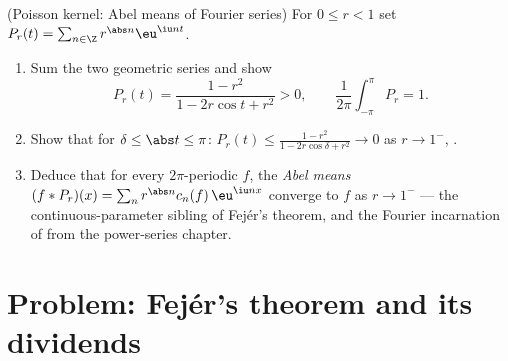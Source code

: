 \begin{exercise}[$\star\star\star$]\label{exo:b2:fourier:12}
(Poisson kernel: Abel means of Fourier series) For $0 \leq r <
1$ set $P_r(t) = \sum_{n\in\Z} r^{\abs n}\eu^{\iu nt}$.
\begin{enumerate}
  \item Sum the two geometric series and show
        \[
        P_r(t) = \frac{1 - r^2}{1 - 2r\cos t + r^2} > 0,
        \qquad
        \frac{1}{2\pi}\int_{-\pi}^{\pi}P_r = 1 .
        \]
  \item Show that for $\delta \leq \abs t \leq \pi$: $P_r(t)
        \leq \frac{1 - r^2}{1 - 2r\cos\delta + r^2} \to 0$ as
        $r \to 1^-$, .
  \item Deduce that for every  $2\pi$-periodic $f$,
        the \emph{Abel means} $(f * P_r)(x) = \sum_n
        r^{\abs n}c_n(f)\,\eu^{\iu nx}$ converge to $f$
         as $r \to 1^-$ --- the continuous-parameter
        sibling of Fej\'er's theorem, and the Fourier
        incarnation of  from the power-series
        chapter.
\end{enumerate}
\end{exercise}

\section{Problem: Fej\'er's theorem and its dividends}

